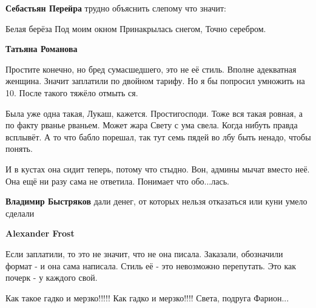 \begin{itemize}
\begin{itemize}
\textbf{Себастьян Перейра} трудно объяснить слепому что значит:

\obeycr
	Белая берёза
	Под моим окном
	Принакрылась снегом,
	Точно серебром.
\restorecr


 
\textbf{Татьяна Романова} 

Простите конечно, но бред сумасшедшего, это не её стиль. Вполне адекватная
женщина. Значит заплатили по двойном тарифу. Но я бы попросил умножить на 10.
После такого тяжёло отмыть ся. 

Была уже одна такая, Лукаш, кажется.  Простигосподи. Тоже вся такая ровная, а
по факту рванье рваньем. Может жара Свету с ума свела. Когда нибуть правда
всплывёт. А то что бабло порешал, так тут семь пядей во лбу быть ненадо, чтобы
понять. 

И в кустах она сидит теперь, потому что стыдно. Вон, админы мычат вместо неё.
Она ещё ни разу сама не ответила. Понимает что обо...лась.

 
\textbf{Владимир Быстряков} дали денег, от которых нельзя отказаться или куни умело сделали

 
\textbf{Alexander Frost}

Если заплатили, то это не значит, что не она писала. Заказали, обозначили
формат - и она сама написала. Стиль её - это невозможно перепутать. Это как
почерк - у каждого свой.


 

Как такое гадко и мерзко!!!!! Как гадко и мерзко!!!! Света, подруга Фарион...


\end{itemize}
\end{itemize}
